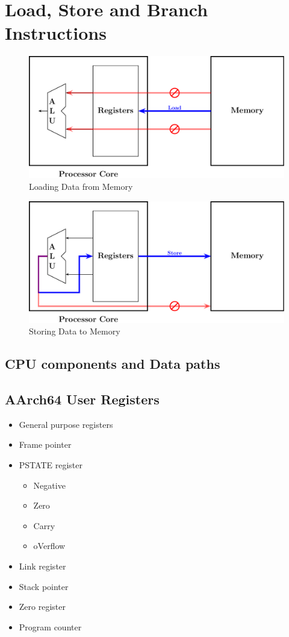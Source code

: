 \section{Load, Store and Branch Instructions}

\begin{figure}[h!]
	\includegraphics[width=\textwidth]{architectures/load.pdf}
	\caption{Loading Data from Memory}
\end{figure}

\begin{figure}[h!]
	\includegraphics[width=\textwidth]{architectures/store.pdf}
	\caption{Storing Data to Memory}
\end{figure}

\subsection{CPU components and Data paths}
\subsection{AArch64 User Registers}
\begin{itemize}
	\item General purpose registers
	\item Frame pointer
	\item PSTATE register
	\begin{itemize}
		\item Negative
		\item Zero
		\item Carry
		\item oVerflow
	\end{itemize}
	\item Link register
	\item Stack pointer
	\item Zero register
	\item Program counter
\end{itemize}

